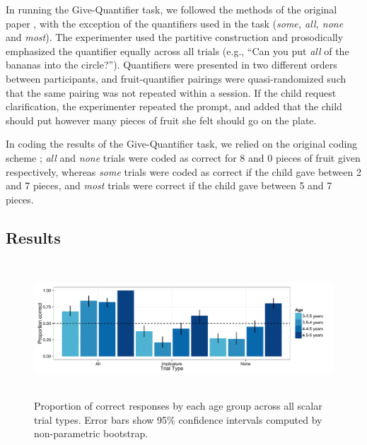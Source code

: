 \documentclass[man]{apa2}
\begin{document}
In running the Give-Quantifier task, we followed the methods of the original paper \cite{barner2009}, with the exception of the quantifiers used in the task (\textit{some, all, none} and \textit{most}). The experimenter used the partitive construction and prosodically emphasized the quantifier equally across all trials (e.g., ``Can you put \textit{all} of the bananas into the circle?''). Quantifiers were presented in two different orders between participants, and fruit-quantifier pairings were quasi-randomized such that the same pairing was not repeated within a session. If the child request clarification, the experimenter repeated the prompt, and added that the child should put however many pieces of fruit she felt should go on the plate. 

In coding the results of the Give-Quantifier task, we relied on the original coding scheme \cite{barner2009}; \textit{all} and \textit{none} trials were coded as correct for 8 and 0 pieces of fruit given respectively, whereas \textit{some} trials were coded as correct if the child gave between 2 and 7 pieces, and \textit{most} trials were correct if the child gave between 5 and 7 pieces. 

\subsection{Results}

\begin{figure} 
 \begin{center} 
  \includegraphics[height=2in]{figures/exp3_performance.pdf} 
  \caption{\label{fig:exp3_perf} Proportion of correct responses by each age group across all scalar trial types.  Error bars show 95\% confidence intervals computed by non-parametric bootstrap.} 
 \end{center} 
\end{figure}
\end{document}
